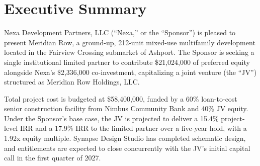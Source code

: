 \section*{Executive Summary}
Nexa Development Partners, LLC (``Nexa,'' or the ``Sponsor'') is pleased to present Meridian
Row, a ground-up, 212-unit mixed-use multifamily development located in the Fairview Crossing
submarket of Ashport. The Sponsor is seeking a single institutional limited partner to
contribute \$21,024,000 of preferred equity alongside Nexa's \$2,336,000 co-investment,
capitalizing a joint venture (the ``JV'') structured as Meridian Row Holdings, LLC.

Total project cost is budgeted at \$58,400,000, funded by a 60\% loan-to-cost senior
construction facility from Nimbus Community Bank and 40\% JV equity. Under the Sponsor's base
case, the JV is projected to deliver a 15.4\% project-level IRR and a 17.9\% IRR to the limited
partner over a five-year hold, with a 1.92x equity multiple. Synapse Design Studio has completed
schematic design, and entitlements are expected to close concurrently with the JV's initial
capital call in the first quarter of 2027.

\vspace{8pt}
\noindent
\begin{minipage}[t]{0.24\textwidth}
\end{minipage}\hfill
\begin{minipage}[t]{0.24\textwidth}
\end{minipage}\hfill
\begin{minipage}[t]{0.24\textwidth}
\end{minipage}\hfill
\begin{minipage}[t]{0.24\textwidth}
\end{minipage}
\par

